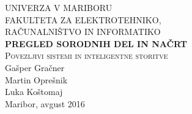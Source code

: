 \documentclass[a4paper,11pt]{article}
\begin{document}
\begin{titlepage}


\newcommand{\HRule}{\rule{\linewidth}{0.5mm}} %

\center %
 

\textsc{ UNIVERZA V MARIBORU\\ FAKULTETA ZA ELEKTROTEHNIKO,\\RAČUNALNIŠTVO IN INFORMATIKO}\\[5cm] %

{ \huge \bfseries \textbf{PREGLED SORODNIH DEL IN NAČRT}}\\[0.4cm] %
\textsc{\large Povezljivi sistemi in inteligentne storitve}\\[5cm] %

{\large Gašper Gračner}\\[0.4cm]
{\large Martin Oprešnik}\\[0.4cm]
{\large Luka Koštomaj}\\[0.4cm] 

\vfill %
{\large Maribor, avgust 2016}\\[3cm] %
\end{titlepage}
\newpage

\end{document}
